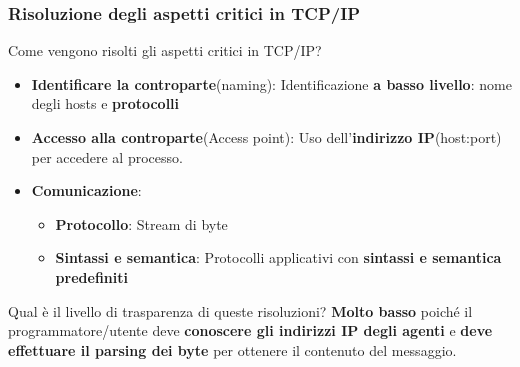 \documentclass[12pt]{article}
\begin{document}
\subsubsection{Risoluzione degli aspetti critici in TCP/IP}
Come vengono risolti gli aspetti critici in TCP/IP?
\begin{itemize}
    \item \textbf{Identificare la controparte}(naming): Identificazione \textbf{a basso livello}: nome degli hosts e \textbf{protocolli}
    \item \textbf{Accesso alla controparte}(Access point): Uso dell'\textbf{indirizzo IP}(host:port) per accedere al processo.
    \item \textbf{Comunicazione}:
          \begin{itemize}
              \item \textbf{Protocollo}: Stream di byte
              \item \textbf{Sintassi e semantica}: Protocolli applicativi con \textbf{sintassi e semantica predefiniti}
          \end{itemize}
\end{itemize}
Qual è il livello di trasparenza di queste risoluzioni? \textbf{Molto basso} poiché il programmatore/utente deve \textbf{conoscere gli indirizzi IP degli agenti} e \textbf{deve effettuare il parsing dei byte} per ottenere il contenuto del messaggio.
\newpage
\end{document}
